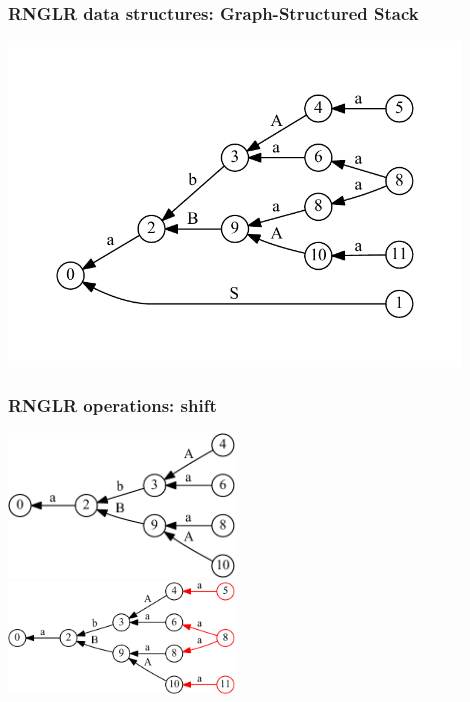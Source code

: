 \documentclass{beamer}
\begin{document}
\begin{frame}
  \transwipe[direction=90]
  \frametitle{RNGLR data structures: Graph-Structured Stack}
  \includegraphics[width=12cm]{pictures/gss_rnglr}
\end{frame}

\begin{frame}
  \transwipe[direction=90]
  \frametitle{RNGLR operations: shift}
  \begin{center}
  \includegraphics[width=6cm]{pictures/gss_rnglr_shift_1} \\ \vspace{10pt} 
  \pause
  \includegraphics[width=6cm]{pictures/gss_rnglr_shift_2}
  \end{center}
\end{frame}
\end{document}
